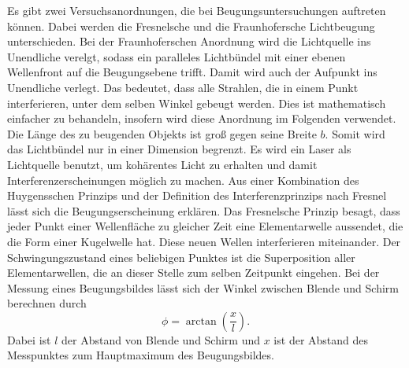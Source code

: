 \noindent Es gibt zwei Versuchsanordnungen, die bei Beugungsuntersuchungen 
auftreten können. Dabei werden die Fresnelsche und die 
Fraunhofersche Lichtbeugung unterschieden. Bei der 
Fraunhoferschen Anordnung wird die Lichtquelle ins Unendliche 
verelgt, sodass ein paralleles Lichtbündel mit einer ebenen 
Wellenfront auf die Beugungsebene trifft. Damit wird auch der Aufpunkt 
ins Unendliche  verlegt. Das bedeutet, dass alle Strahlen, die 
in einem Punkt interferieren, unter dem selben Winkel gebeugt 
werden. Dies ist mathematisch einfacher zu behandeln, insofern 
wird diese Anordnung im Folgenden verwendet. 
\newline
Die Länge des zu beugenden Objekts ist groß gegen seine 
Breite $b$. Somit wird das Lichtbündel nur in einer 
Dimension begrenzt.
\newline
Es wird ein Laser als Lichtquelle benutzt, um kohärentes Licht 
zu erhalten und damit Interferenzerscheinungen möglich zu machen. 
\newline
Aus einer Kombination des Huygensschen Prinzips und der 
Definition des Interferenzprinzips nach Fresnel lässt sich die 
Beugungserscheinung erklären. Das Fresnelsche Prinzip besagt, 
dass jeder Punkt einer Wellenfläche zu gleicher Zeit eine 
Elementarwelle aussendet, die die Form einer Kugelwelle hat. 
Diese neuen Wellen interferieren miteinander. Der 
Schwingungszustand eines beliebigen Punktes ist 
die Superposition aller Elementarwellen, die an dieser Stelle zum 
selben Zeitpunkt eingehen.
\newline
Bei der Messung eines Beugungsbildes lässt sich der Winkel
zwischen Blende und Schirm berechnen durch 
\begin{equation}
    \phi = \arctan (\frac{x}{l}).
    \label{eqn:phi}
\end{equation}
Dabei ist $l$ der Abstand von Blende und Schirm und
$x$ ist der Abstand des Messpunktes zum Hauptmaximum
des Beugungsbildes. %


